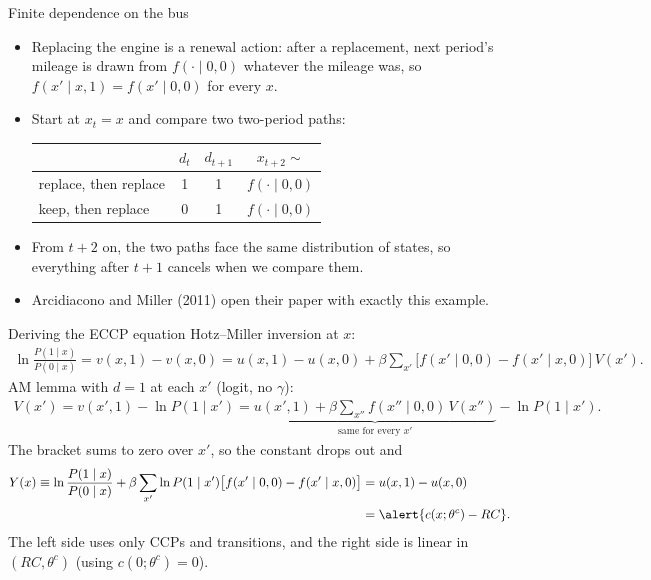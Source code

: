 \documentclass[aspectratio=169,11pt]{beamer}
\begin{document}
\begin{frame}{Finite dependence on the bus}
\begin{itemize}
\item Replacing the engine is a renewal action: after a replacement, next period's mileage is drawn from $f(\cdot \mid 0,0)$ whatever the mileage was, so $f(x' \mid x,1) = f(x' \mid 0,0)$ for every $x$.
\item Start at $x_t = x$ and compare two two-period paths:
\par\smallskip
{\centering
\begin{tabular}{lccc}
\toprule
 & $d_t$ & $d_{t+1}$ & $x_{t+2} \sim$ \\
\midrule
replace, then replace & 1 & 1 & $f(\cdot \mid 0,0)$\\
keep, then replace & 0 & 1 & $f(\cdot \mid 0,0)$\\
\bottomrule
\end{tabular}\par}
\smallskip
\item From $t+2$ on, the two paths face the same distribution of states, so everything after $t+1$ cancels when we compare them.
\item Arcidiacono and Miller (2011) open their paper with exactly this example.
\end{itemize}
\end{frame}

\begin{frame}{Deriving the ECCP equation}
\small
Hotz--Miller inversion at $x$:
\begin{align*}
\ln \frac{P(1 \mid x)}{P(0 \mid x)} = v(x,1) - v(x,0) = u(x,1) - u(x,0) + \beta \sum_{x'} \big[f(x' \mid 0,0) - f(x' \mid x,0)\big]\, V(x').
\end{align*}
AM lemma with $d = 1$ at each $x'$ (logit, no $\gamma$):
\begin{align*}
V(x') = v(x',1) - \ln P(1 \mid x') = \underbrace{u(x',1) + \beta \textstyle\sum_{x''} f(x'' \mid 0,0)\, V(x'')}_{\text{same for every } x'} - \ln P(1 \mid x').
\end{align*}
The bracket sums to zero over $x'$, so the constant drops out and
\begin{align*}
Y(x) \equiv \ln \frac{P(1 \mid x)}{P(0 \mid x)} + \beta \sum_{x'} \ln P(1 \mid x') \big[f(x' \mid 0,0) - f(x' \mid x,0)\big] &= u(x,1) - u(x,0)\\
&= \alert{c(x;\theta^c) - RC}.
\end{align*}
The left side uses only CCPs and transitions, and the right side is \alert{linear} in $(RC, \theta^c)$ (using $c(0;\theta^c) = 0$).
\end{frame}
\end{document}
